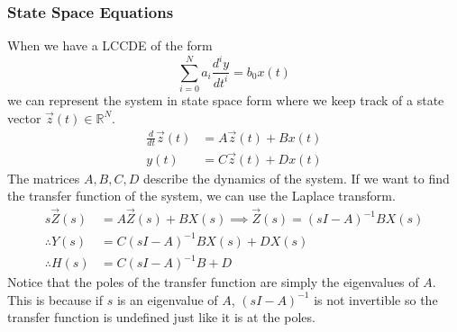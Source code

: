 \documentclass{article}
\begin{document}
\subsubsection{State Space Equations}
When we have a LCCDE of the form
$$\sum_{i=0}^{N}{a_i\frac{d^iy}{dt^i}} = b_0x(t)$$
we can represent the system in state space form where we keep track of a state vector $\vec{z}(t)\in\mathbb{R}^N$.
\begin{align*}
    \frac{d}{dt}\vec{z}(t) &= A\vec{z}(t)+Bx(t)\\
    y(t) &= C\vec{z}(t)+Dx(t)
\end{align*}
The matrices $A,B,C,D$ describe the dynamics of the system.
If we want to find the transfer function of the system, we can use the Laplace transform.
\begin{align*}
    s\vec{Z}(s) &= A\vec{Z}(s)+BX(s) \implies \vec{Z}(s) = (sI-A)^{-1}BX(s)\\
    \therefore Y(s) &= C(sI-A)^{-1}BX(s)+DX(s)\\
    \therefore H(s) &= C(sI-A)^{-1}B+D
\end{align*}
Notice that the poles of the transfer function are simply the eigenvalues of $A$. This is because
if $s$ is an eigenvalue of $A$, $(sI-A)^{-1}$ is not invertible so the transfer function is undefined
just like it is at the poles.
\end{document}
